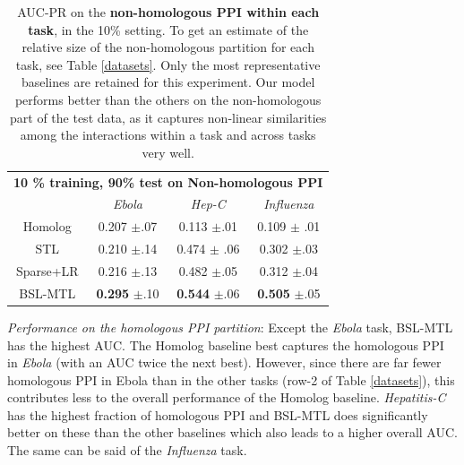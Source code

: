 \documentclass{bioinfo}
\begin{document}
\begin{table}[!h]
\caption{AUC-PR on the \textbf{non-homologous PPI within each task}, in the 10\% setting. To get an estimate of the relative size of the non-homologous partition for each task, see Table \ref{datasets}. Only the most representative baselines are retained for this experiment. Our model performs better than the others on the non-homologous part of the test data, as it captures non-linear similarities among the interactions within a task and across tasks very well.}
\label{nohomresultsTable}
\begin{small}
\begin{center}
\begin{tabular}{c|ccc}
\toprule
\multicolumn{4}{c}{\textbf{10 \% training, 90\% test on Non-homologous PPI}} \\
& \textit{Ebola} & \textit{Hep-C} & \textit{Influenza} \\ \midrule
Homolog & 0.207 $\pm$.07 & 0.113 $\pm$.01 & 0.109 $\pm$ .01 \\
STL  & 0.210 $\pm$.14 & 0.474 $\pm$ .06 & 0.302 $\pm$.03 \\
Sparse+LR & 0.216 $\pm$.13 & 0.482 $\pm$.05 & 0.312 $\pm$.04 \\ 
BSL-MTL & \textbf{0.295} $\pm$.10 & \textbf{0.544} $\pm$.06 & \textbf{0.505} $\pm$.05 \\ \bottomrule
\end{tabular}
\end{center}
\end{small}
\end{table}


\noindent\textit{Performance on the homologous PPI partition}:
Except the \textit{Ebola} task, BSL-MTL has the highest AUC. The Homolog baseline best captures the homologous PPI in \textit{Ebola} (with an AUC twice the next best). However, since there are far fewer homologous PPI in Ebola than in the other tasks (row-2 of Table \ref{datasets}), this contributes less to the overall performance of the Homolog baseline. \textit{Hepatitis-C} has the highest fraction of homologous PPI and BSL-MTL does significantly better on these than the other baselines which also leads to a higher overall AUC. The same can be said of the \textit{Influenza} task.

\end{document}
